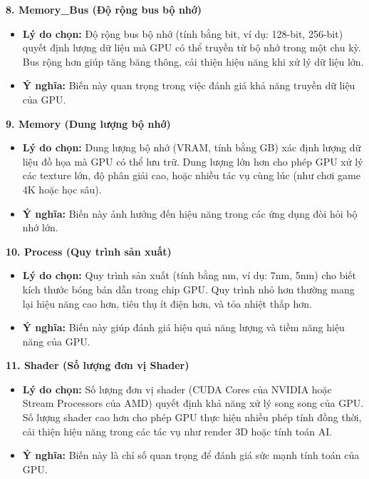  \textbf{8. Memory\_Bus (Độ rộng bus bộ nhớ)}

 \begin{itemize}
     \item \textbf{\textbf{Lý do chọn:}} Độ rộng bus bộ nhớ (tính bằng bit, ví dụ: 128-bit, 256-bit) quyết định lượng dữ liệu mà GPU có thể truyền từ bộ nhớ trong một chu kỳ. Bus rộng hơn giúp tăng băng thông, cải thiện hiệu năng khi xử lý dữ liệu lớn.
     \item \textbf{Ý nghĩa:} Biến này quan trọng trong việc đánh giá khả năng truyền dữ liệu của GPU.
 \end{itemize}

 \textbf{9. Memory (Dung lượng bộ nhớ)}

 \begin{itemize}
     \item \textbf{Lý do chọn:} Dung lượng bộ nhớ (VRAM, tính bằng GB) xác định lượng dữ liệu đồ họa mà GPU có thể lưu trữ. Dung lượng lớn hơn cho phép GPU xử lý các texture lớn, độ phân giải cao, hoặc nhiều tác vụ cùng lúc (như chơi game 4K hoặc học sâu).
     \item \textbf{Ý nghĩa:} Biến này ảnh hưởng đến hiệu năng trong các ứng dụng đòi hỏi bộ nhớ lớn.
 \end{itemize}

 \textbf{10. Process (Quy trình sản xuất)}

 \begin{itemize}
     \item \textbf{Lý do chọn:} Quy trình sản xuất (tính bằng nm, ví dụ: 7nm, 5nm) cho biết kích thước bóng bán dẫn trong chip GPU. Quy trình nhỏ hơn thường mang lại hiệu năng cao hơn, tiêu thụ ít điện hơn, và tỏa nhiệt thấp hơn.
     \item \textbf{Ý nghĩa:} Biến này giúp đánh giá hiệu quả năng lượng và tiềm năng hiệu năng của GPU.
 \end{itemize}

 \textbf{11. Shader (Số lượng đơn vị Shader)}

 \begin{itemize}
     \item \textbf{Lý do chọn:} Số lượng đơn vị shader (CUDA Cores của NVIDIA hoặc Stream Processors của AMD) quyết định khả năng xử lý song song của GPU. Số lượng shader cao hơn cho phép GPU thực hiện nhiều phép tính đồng thời, cải thiện hiệu năng trong các tác vụ như render 3D hoặc tính toán AI.
     \item \textbf{Ý nghĩa:} Biến này là chỉ số quan trọng để đánh giá sức mạnh tính toán của GPU.
 \end{itemize}

